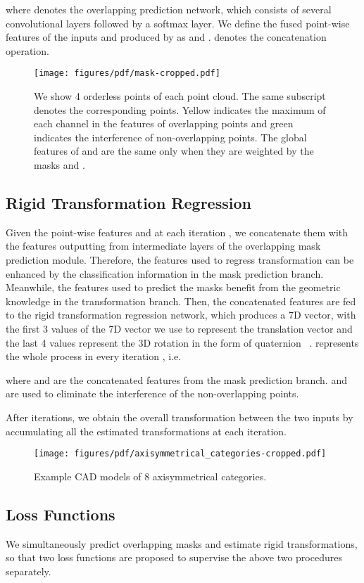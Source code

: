 \documentclass[10pt,twocolumn,letterpaper]{article}
\begin{document}
    
where  denotes the overlapping prediction network, which consists of several convolutional layers followed by a softmax layer. We define the fused point-wise features of the inputs  and  produced by  as  and .  denotes the concatenation operation.
\begin{figure}[t]
    \centering
    \texttt{[image: figures/pdf/mask-cropped.pdf]}\\
    \caption{We show 4 orderless points of each point cloud. The same subscript denotes the corresponding points. Yellow indicates the maximum of each channel in the features of overlapping points and green indicates the interference of non-overlapping points. The global features of  and  are the same only when they are weighted by the masks  and .}
    \vspace{-0.1cm}
    \label{fig:mask}
\end{figure} \subsection{Rigid Transformation Regression} \label{sec:3.3}
Given the point-wise features  and  at each iteration , we concatenate them with the features outputting from intermediate layers of the overlapping mask prediction module. Therefore, the features used to regress transformation can be enhanced by the classification information in the mask prediction branch. Meanwhile, the features used to predict the masks benefit from the geometric knowledge in the transformation branch. Then, the concatenated features are fed to the rigid transformation regression network, which produces a 7D vector, with the first 3 values of the 7D vector we use to represent the translation vector  and the last 4 values represent the 3D rotation in the form of quaternion~\cite{shoemake1985animating} .  represents the whole process in every iteration , i.e.

where  and  are the concatenated features from the mask prediction branch.  and  are used to eliminate the interference of the non-overlapping points.

After  iterations, we obtain the overall transformation between the two inputs by accumulating all the estimated transformations at each iteration.

\begin{figure}[t]
   \centering
   \texttt{[image: figures/pdf/axisymmetrical\_categories-cropped.pdf]}\\
   \caption{Example CAD models of 8 axisymmetrical categories.}
   \vspace{-0.1cm}
   \label{fig:axisymmetrical categories}
\end{figure} \subsection{Loss Functions} \label{sec:3.4}
We simultaneously predict overlapping masks and estimate rigid transformations, so that two loss functions are proposed to supervise the above two procedures separately.
\end{document}
